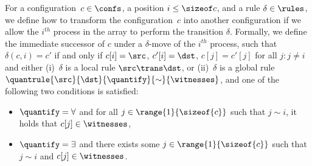 %
%
%
%
For a configuration~$c\in\confs$, a position $i\leq\sizeof c$, and a
rule $\delta\in\rules$, we define how to transform the
configuration~$c$ into another configuration if we allow the
$i^{th}$ process in the array to perform the transition $\delta$.
%
%
Formally, we define the immediate successor of $c$ under a
$\delta$-move of the $i^{th}$ process, such that $\delta(c,i)=c'$ if
and only if $c[i] = \src$, $c'[i] = \dst$, $c[j]=c'[j]$ for all
$j:j\neq i$ and either (i)~$\delta$ is a local rule $\src\trans\dst$,
or (ii)~$\delta$ is a global rule %
$\quantrule{\src}{\dst}{\quantify}{\sim}{\witnesses}$, and one of the
following two conditions is satisfied: %
\begin{itemize}
\item %
  $\quantify=\forall$ and for all $j\in\range{1}{\sizeof{c}}$ such
  that $j\sim i$, it holds that $c[j]\in \witnesses$,%
\item %
  $\quantify=\exists$ and there exists some
  $j\in\range{1}{\sizeof{c}}$ such that $j\sim i$ and
  $c[j]\in \witnesses$.
\end{itemize}
%
%
